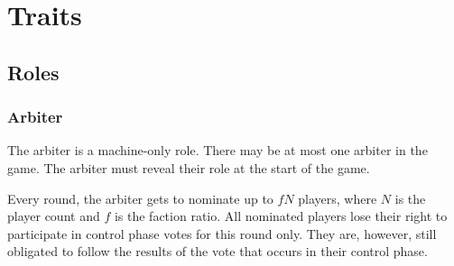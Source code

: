 \chapter{Traits}

\section{Roles}

\subsection{Arbiter}

The arbiter is a machine-only role.
There may be at most one arbiter in the game.
The arbiter must reveal their role at the start of the game.

Every round, the arbiter gets to nominate up to \(fN\) players, where \(N\) is the player count and \(f\) is the faction ratio.
All nominated players lose their right to participate in control phase votes for this round only.
They are, however, still obligated to follow the results of the vote that occurs in their control phase.